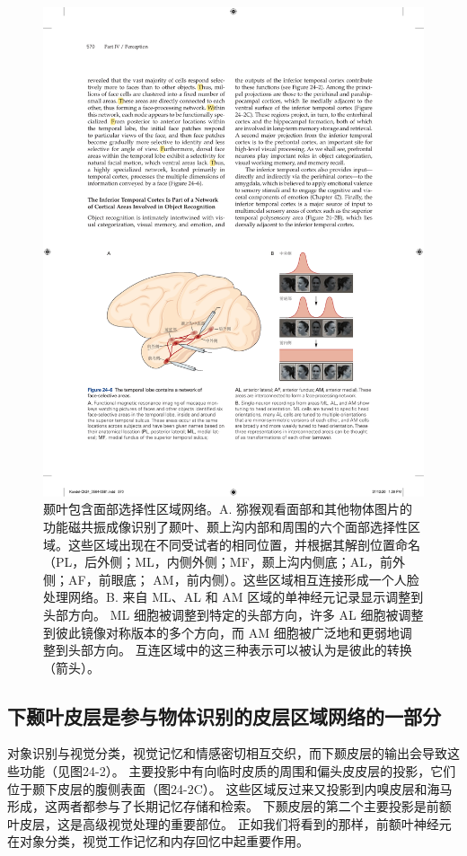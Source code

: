 \begin{figure}[htbp]
	\centering
	\includegraphics[width=0.9\linewidth]{chap24/fig_24_6}
	\caption{颞叶包含面部选择性区域网络。A. 猕猴观看面部和其他物体图片的功能磁共振成像识别了颞叶、颞上沟内部和周围的六个面部选择性区域。这些区域出现在不同受试者的相同位置，并根据其解剖位置命名（PL，后外侧；ML，内侧外侧；MF，颞上沟内侧底；AL，前外侧；AF，前眼底； AM，前内侧）。这些区域相互连接形成一个人脸处理网络。B. 来自 ML、AL 和 AM 区域的单神经元记录显示调整到头部方向。 ML 细胞被调整到特定的头部方向，许多 AL 细胞被调整到彼此镜像对称版本的多个方向，而 AM 细胞被广泛地和更弱地调整到头部方向。 互连区域中的这三种表示可以被认为是彼此的转换（箭头）。}
	\label{fig:24_6}
\end{figure}



\subsection{下颞叶皮层是参与物体识别的皮层区域网络的一部分}

对象识别与视觉分类，视觉记忆和情感密切相互交织，而下颞皮层的输出会导致这些功能（见图24-2）。
主要投影中有向临时皮质的周围和偏头皮皮层的投影，它们位于颞下皮层的腹侧表面（图24-2C）。
这些区域反过来又投影到内嗅皮层和海马形成，这两者都参与了长期记忆存储和检索。
下颞皮层的第二个主要投影是前额叶皮层，这是高级视觉处理的重要部位。
正如我们将看到的那样，前额叶神经元在对象分类，视觉工作记忆和内存回忆中起重要作用。


